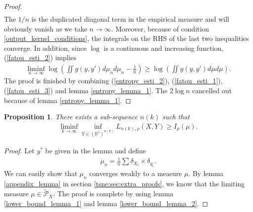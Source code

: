 \documentclass[10pt]{article}
\newtheorem{proposition}{\bf Proposition}
\newenvironment{Proof of lemma}{\noindent{\bf Proof of Lemma}}{\hfill$\Box$\newline}
\newenvironment{Proof of claim}{\noindent{\bf Proof of claim}}{\hfill$\Box$\newline}
\newenvironment{Proof of theorem}{\noindent{\bf Proof of Theorem}}{\hfill\scriptsize{$\Box$}\newline}
\newenvironment{Proof of theorems}{\noindent{\bf Proof of Theorems}}{\hfill$\Box$\newline}
\newenvironment{Proof of proposition}{\noindent{\bf Proof of Proposition}}{\hfill$\Box$\newline}
\newenvironment{Proof of propositions}{\noindent{\bf Proof of Propositions}}{\hfill$\Box$\newline}
\newenvironment{Proof of exercise}{\noindent{\it Proof of Exercise:}}{\hfill$\Box$}
\numberwithin{equation}{section}
\begin{document}
\begin{proof}
\begin{align}
    \end{align}
    The $1/n$ is the duplicated diagonal term in the empirical measure and will obviously vanish as we take $n \to \infty$. Moreover, because of condition \ref{output_kernel_conditions}, the integrals on the RHS of the last two inequalities converge. In addition, since $\log$ is a continuous and increasing function, (\ref{fatou_esti_2}) implies
    \begin{align} \label{fatou_esti_3}
        \liminf_{n \to \infty} \log \left(\iint g(y,y') d\mu_n d\mu_n - \frac{1}{n}\right) \geq \log \left(\iint g(y,y')d\mu d\mu \right).
    \end{align}
    The proof is finished by combining (\ref{entropy_esti_2}), (\ref{fatou_esti_1}), (\ref{fatou_esti_3}) and lemma \ref{entropy_lemma_1}. The $2 \log n$ cancelled out because of lemma \ref{entropy_lemma_1}.
\end{proof}
\begin{proposition} \label{lower_bound_prop}
    There exists a sub-sequence $n(k)$ such that
    \begin{align}
        \liminf_{k \to \infty} \inf_{Y \in (\mathbb{R}^s)^{n(k)}} L_{n(k),\rho}(X,Y) \geq I_{\rho}(\mu).
    \end{align}
\end{proposition}
\begin{proof}
    Let $y^*$ be given in the lemma and define
    \begin{align}
        \mu_n = \frac{1}{n} \sum \delta_{X_i} \times \delta_{y_i}.
    \end{align}
    We can easily show that $\mu_n$ converges weakly to a measure $\mu$. By lemma \ref{appendix_lemma} in section \ref{tsne:sec:extra_proofs}, we know that the limiting measure $\mu \in \tilde{\mathcal{P}}_X$. The proof is complete by using lemma \ref{lower_bound_lemma_1} and lemma \ref{lower_bound_lemma_2}.
\end{proof}
\end{document}
